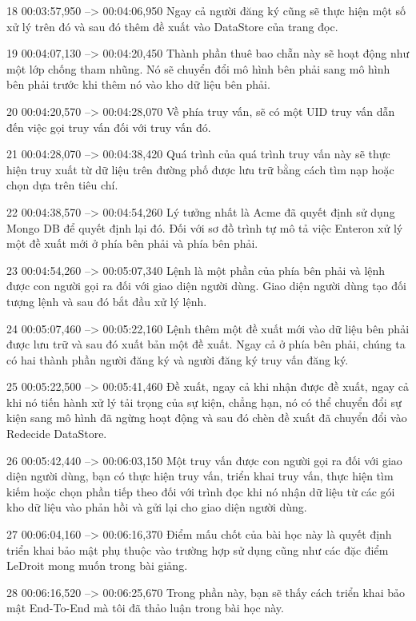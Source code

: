18
00:03:57,950 --> 00:04:06,950
Ngay cả người đăng ký cũng sẽ thực hiện một số xử lý trên đó và sau đó thêm đề xuất vào DataStore của trang đọc.

19
00:04:07,130 --> 00:04:20,450
Thành phần thuê bao chẵn này sẽ hoạt động như một lớp chống tham nhũng.  Nó sẽ chuyển đổi mô hình bên phải sang mô hình bên phải trước khi thêm nó vào kho dữ liệu bên phải.

20
00:04:20,570 --> 00:04:28,070
Về phía truy vấn, sẽ có một UID truy vấn dẫn đến việc gọi truy vấn đối với truy vấn đó.

21
00:04:28,070 --> 00:04:38,420
Quá trình của quá trình truy vấn này sẽ thực hiện truy xuất từ ​​dữ liệu trên đường phố được lưu trữ bằng cách tìm nạp hoặc chọn dựa trên tiêu chí.

22
00:04:38,570 --> 00:04:54,260
Lý tưởng nhất là Acme đã quyết định sử dụng Mongo DB để quyết định lại đó.  Đối với sơ đồ trình tự mô tả việc Enteron xử lý một đề xuất mới ở phía bên phải và phía bên phải.

23
00:04:54,260 --> 00:05:07,340
Lệnh là một phần của phía bên phải và lệnh được con người gọi ra đối với giao diện người dùng.  Giao diện người dùng tạo đối tượng lệnh và sau đó bắt đầu xử lý lệnh.

24
00:05:07,460 --> 00:05:22,160
Lệnh thêm một đề xuất mới vào dữ liệu bên phải được lưu trữ và sau đó xuất bản một đề xuất.  Ngay cả ở phía bên phải, chúng ta có hai thành phần người đăng ký và người đăng ký truy vấn đăng ký.

25
00:05:22,500 --> 00:05:41,460
Đề xuất, ngay cả khi nhận được đề xuất, ngay cả khi nó tiến hành xử lý tải trọng của sự kiện, chẳng hạn, nó có thể chuyển đổi sự kiện sang mô hình đã ngừng hoạt động và sau đó chèn đề xuất đã chuyển đổi vào Redecide DataStore.

26
00:05:42,440 --> 00:06:03,150
Một truy vấn được con người gọi ra đối với giao diện người dùng, bạn có thực hiện truy vấn, triển khai truy vấn, thực hiện tìm kiếm hoặc chọn phần tiếp theo đối với trình đọc khi nó nhận dữ liệu từ các gói kho dữ liệu vào phản hồi và gửi lại cho  giao diện người dùng.

27
00:06:04,160 --> 00:06:16,370
Điểm mấu chốt của bài học này là quyết định triển khai bảo mật phụ thuộc vào trường hợp sử dụng cũng như các đặc điểm LeDroit mong muốn trong bài giảng.

28
00:06:16,520 --> 00:06:25,670
Trong phần này, bạn sẽ thấy cách triển khai bảo mật End-To-End mà tôi đã thảo luận trong bài học này.

